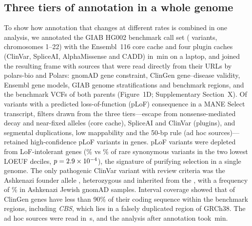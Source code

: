 \subsection*{Three tiers of annotation in a whole genome}

To show how annotation that changes at different rates is combined in one
analysis, we annotated the GIAB HG002 benchmark call set (\NVariants{}
variants, chromosomes 1--22) with the Ensembl~116 core cache and four plugin
caches (ClinVar, SpliceAI, AlphaMissense and CADD) in
\AnnotateMin\,min on a laptop, and joined the resulting frame with
\NRemoteSources{} sources that were read directly from their URLs by
polars-bio and Polars: gnomAD gene constraint, ClinGen gene--disease
validity, Ensembl gene models, GIAB genome stratifications and benchmark
regions, and the benchmark VCFs of both parents (Figure~1D; Supplementary
Section~X). Of \NPlof{} variants with a predicted loss-of-function (pLoF)
consequence in a MANE Select transcript, filters drawn from the three
tiers---escape from nonsense-mediated decay and near-fixed alleles (core
cache), SpliceAI and ClinVar (plugins), and segmental duplications, low
mappability and the 50-bp rule (ad hoc sources)---retained \NHc{}
high-confidence pLoF variants in \NHcGenes{} genes. pLoF variants were
depleted from LoF-intolerant genes (\LoeufAllPlofPct\% vs \LoeufSynPct\% of
rare synonymous variants in the two lowest LOEUF deciles,
$p=2.9\times10^{-4}$), the signature of purifying selection in a single
genome. The only pathogenic ClinVar variant with review criteria was the
Ashkenazi founder allele \textit{\PlpGene} \PlpHgvsp{}, heterozygous and
inherited from the \PlpParent{}, with a frequency of \PlpAsj\% in Ashkenazi
Jewish gnomAD samples. Interval coverage showed that \NClinGenLtNinety{} of
\NClinGenGenes{} ClinGen genes have less than 90\% of their coding sequence
within the benchmark regions, including \textit{CBS}, which lies in a
falsely duplicated region of GRCh38. The ad hoc sources were read in
\RemoteSec\,s, and the analysis after annotation took \AnalyzeMin\,min.
